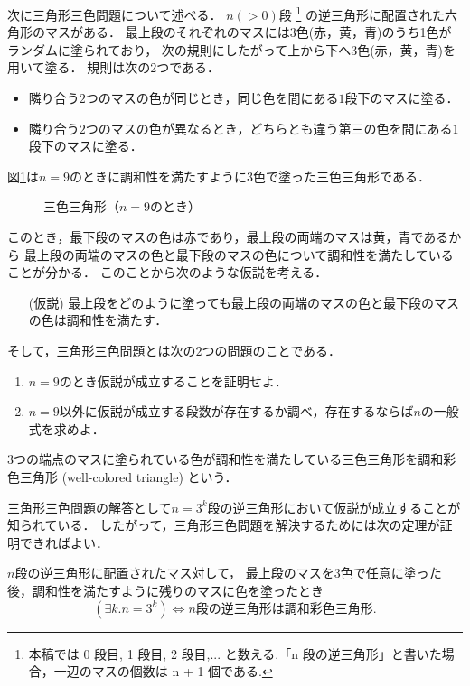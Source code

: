 次に三角形三色問題について述べる．
$n(>0)$段
\footnote{
  本稿では 0 段目, 1 段目, 2 段目,... と数える.「n 段の逆三角形」と書いた場合，一辺のマスの個数は n + 1 個である.
  }
の逆三角形に配置された六角形のマスがある．
最上段のそれぞれのマスには$3$色(赤，黄，青)のうち1色がランダムに塗られており，
次の規則にしたがって上から下へ$3$色(赤，黄，青)を用いて塗る．
規則は次の$2$つである．
\begin{itemize}
  \item
    隣り合う$2$つのマスの色が同じとき，同じ色を間にある$1$段下のマスに塗る．
  \item
    隣り合う$2$つのマスの色が異なるとき，どちらとも違う第三の色を間にある$1$段下のマスに塗る．
\end{itemize}
図\ref{fig:nine_steps}は$n=9$のときに調和性を満たすように3色で塗った三色三角形である．
\begin{figure}[h]
    \centering
    
    \caption{三色三角形（$n=9$のとき）}
    \label{fig:nine_steps}
\end{figure}
このとき，最下段のマスの色は赤であり，最上段の両端のマスは黄，青であるから
最上段の両端のマスの色と最下段のマスの色について調和性を満たしていることが分かる．
このことから次のような仮説を考える．
\begin{itemize}
  \item[(仮説)]
  最上段をどのように塗っても最上段の両端のマスの色と最下段のマスの色は調和性を満たす．
\end{itemize}
そして，三角形三色問題とは次の$2$つの問題のことである．
\begin{enumerate}
\item \label{que:1}
  $n=9$のとき仮説が成立することを証明せよ．
\item \label{que:2}
  $n=9$以外に仮説が成立する段数が存在するか調べ，存在するならば$n$の一般式を求めよ．
\end{enumerate}
\begin{dfn}[調和彩色三角形] \label{dfn:wc_tri}
  $3$つの端点のマスに塗られている色が調和性を満たしている三色三角形を調和彩色三角形 (well-colored triangle) という．
\end{dfn}
三角形三色問題の解答として$n=3^k$段の逆三角形において仮説が成立することが知られている．
したがって，三角形三色問題を解決するためには次の定理が証明できればよい．
\begin{thm} \label{thm:tri_iff}
  $n$段の逆三角形に配置されたマス対して，
  最上段のマスを$3$色で任意に塗った後，調和性を満たすように残りのマスに色を塗ったとき
  \[
  (\exists k.n=3^k) \Leftrightarrow \text{$n$段の逆三角形は調和彩色三角形}.
  \]
\end{thm}

